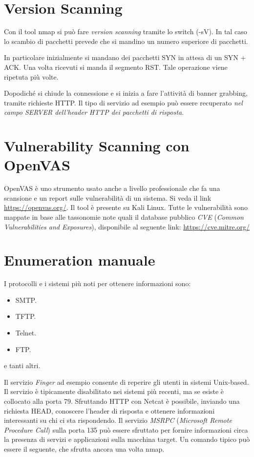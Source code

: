 \documentclass[14pt]{extreport}
\begin{document}
\section{Version Scanning}
Con il tool nmap si può fare \textit{version scanning} tramite lo switch (-sV). In tal caso lo scambio di pacchetti prevede che si mandino un numero superiore di pacchetti.

In particolare inizialmente si mandano dei pacchetti SYN in attesa di un SYN + ACK. Una volta ricevuti si manda il segmento RST. Tale operazione viene ripetuta più volte.

Dopodiché si chiude la connessione e si inizia a fare l'attività di banner grabbing, tramite richieste HTTP. Il tipo di servizio ad esempio può essere recuperato \textit{nel campo SERVER dell'header HTTP dei pacchetti di risposta}.



\section{Vulnerability Scanning con OpenVAS}
OpenVAS è uno strumento usato anche a livello professionale che fa una scansione e un report sulle vulnerabilità di un sistema. Si veda il link \url{https://openvas.org/}. Il tool è presente su Kali Linux. Tutte le vulnerabilità sono mappate in base alle tassonomie note quali il database pubblico \textit{CVE} (\textit{Common Vulnerabilities and Exposures}), disponibile al seguente link: \url{https://cve.mitre.org/}


\section{Enumeration manuale}
I protocolli e i sistemi più noti per ottenere informazioni sono:

\begin{itemize}
    \item SMTP.
    \item TFTP.
    \item Telnet.
    \item FTP.
\end{itemize}
e tanti altri.

Il servizio \textit{Finger} ad esempio consente di reperire gli utenti in sistemi Unix-based. Il servizio è tipicamente disabilitato nei sistemi più recenti, ma se esiste è collocato alla porta 79.
Sfruttando HTTP con Netcat è possibile, inviando una richiesta HEAD, conoscere l'header di risposta e ottenere informazioni interessanti su chi ci sta rispondendo.
Il servizio \textit{MSRPC} (\textit{Microsoft Remote Procedure Call}) sulla porta 135 può essere sfruttato per fornire informazioni circa la presenza di servizi e applicazioni sulla macchina target.
Un comando tipico può essere il seguente, che sfrutta ancora una volta nmap.
\end{document}
